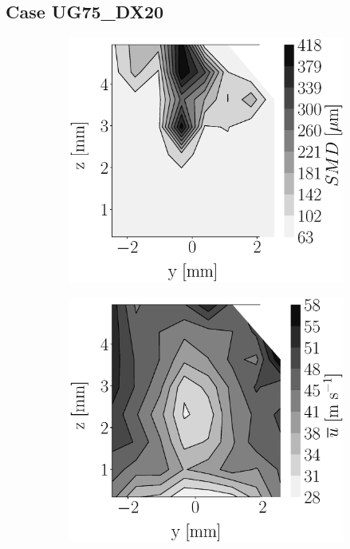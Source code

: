 \clearpage

\subsection*{Case UG75\_DX20}





\begin{figure}[h!]
\flushleft
\begin{subfigure}[b]{0.22\textwidth}
	\centering
   \includegraphics[scale=0.17]{./part2_developments/figures_ch5_resolved_JICF/injectors_SLI/uG75_dx20_x05_SMD_map.eps}
\end{subfigure}
   \hspace{0.17in}
\begin{subfigure}[b]{0.22\textwidth}
	\centering
   \includegraphics[scale=0.17]{./part2_developments/figures_ch5_resolved_JICF/injectors_SLI/uG75_dx20_x05_ux_mean_map.eps}

\end{subfigure}
\end{figure}
